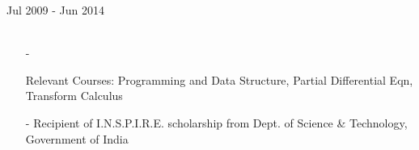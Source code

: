 \documentclass[a4paper, 10pt, oneside]{article}
\newcommand{\bulltetspace}{\vspace{-0.2em}}
\begin{document}
\begin{center}
 \hfill {Jul 2009 - Jun 2014}\\
\color{text1}{Bachelors (Honors) \& Masters (Honors) of Science in Exploration Geophysics} \hfill\\%
\begin{itemize}
\vspace{-0.7em}
\item[-] \raggedright{Relevant Courses:} Programming and Data Structure, Partial Differential Eqn, Transform Calculus\\%
 \bulltetspace
\item[-] Recipient of I.N.S.P.I.R.E. scholarship from Dept. of Science \& Technology, Government of India\\
\vspace{-1.2 em}
\end{itemize}
\end{center}
\end{document}
